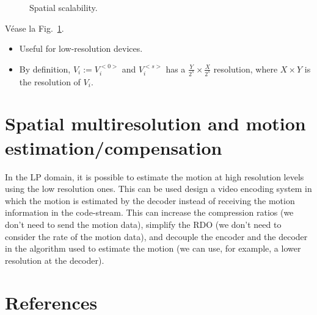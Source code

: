 \begin{figure}
  \caption{Spatial scalability.}
  \label{fig:spatial-scalability}
\end{figure}

Véase la Fig.~\ref{fig:spatial-scalability}.

\begin{itemize}
\item
  Useful for low-resolution devices.
\item
  By definition, $V_i:=V_i^{<0>}$ and $V_i^{<s>}$ has a
  $\frac{Y}{2^s}\times \frac{X}{2^s}$ resolution, where $X\times Y$
  is the resolution of $V_i$.
\end{itemize}

\section{Spatial multiresolution and motion estimation/compensation}

In the LP domain, it is possible to estimate the motion at high
resolution levels using the low resolution ones. This can be used
design a video encoding system in which the motion is estimated by the
decoder instead of receiving the motion information in the
code-stream. This can increase the compression ratios (we don't need
to send the motion data), simplify the RDO (we don't need to consider
the rate of the motion data), and decouple the encoder and the decoder
in the algorithm used to estimate the motion (we can use, for example,
a lower resolution at the decoder).

\section{References}

\renewcommand{\addcontentsline}[3]{}%

